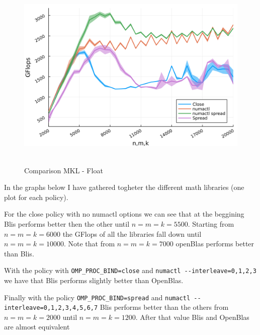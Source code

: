\documentclass[
  letterpaper,
  DIV=11,
  numbers=noendperiod]{scrartcl}
\begin{document}
\begin{figure}

{\centering \includegraphics[width=\textwidth,height=3.64583in]{img/float_mkl_comparison.png}

}

\caption{Comparison MKL - Float}

\end{figure}

\newpage

In the graphs below I have gathered togheter the different math
libraries (one plot for each policy).

For the close policy with no numactl options we can see that at the
beggining Blis performs better then the other until \(n=m=k=5500\).
Starting from \(n=m=k=6000\) the GFlops of all the libraries fall down
until \(n=m=k=10000\). Note that from \(n=m=k=7000\) openBlas performs
better than Blis.

With the policy with \texttt{OMP\_PROC\_BIND=close} and
\texttt{numactl\ -\/-interleave=0,1,2,3} we have that Blis performs
slightly better than OpenBlas.

Finally with the policy \texttt{OMP\_PROC\_BIND=spread} and
\texttt{numactl\ -\/-interleave=0,1,2,3,4,5,6,7} Blis performs better
than the others from \(n=m=k=2000\) until \(n=m=k=1200\). After that
value Blis and OpenBlas are almost equivalent
\end{document}
